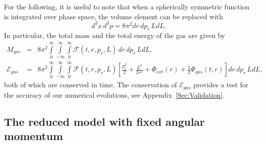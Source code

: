 For the following, it is useful to note that when a spherically symmetric function is integrated over phase space, the volume element can be replaced with
\begin{equation}
d^3 x\, d^3 p = 8\pi^2 dr\, dp_r\, L dL.
\label{Eq:PSVolumeForm}
\end{equation}
In particular, the total mass and the total energy of the gas are given by
\begin{eqnarray}
M_{gas} &=& 8\pi^2\int\limits_0^\infty\int\limits_{-\infty}^\infty\int\limits_0^\infty \mathcal{F}(t,r,p_r,L)\, dr\, dp_r\, L dL,
\label{Eq:Mgas}\\
\mathcal{E}_{gas} &=& 8\pi^2\int\limits_0^\infty\int\limits_{-\infty}^\infty\int\limits_0^\infty \mathcal{F}(t,r,p_r,L)\left[ \frac{p_r^2}{2} + \frac{L^2}{2r^2} + \Phi_{ext}(r) + \frac{1}{2}\Phi_{gas}(t,r) \right] dr\, dp_r\, L dL,
\label{Eq:Egas}
\end{eqnarray}
both of which are conserved in time. The conservation of $\mathcal{E}_{gas}$ provides a test for the accuracy of our numerical evolutions, see Appendix~\ref{Sec:Validation}.


\subsection{The reduced model with fixed angular momentum}
\label{SubSec:FixedL}

